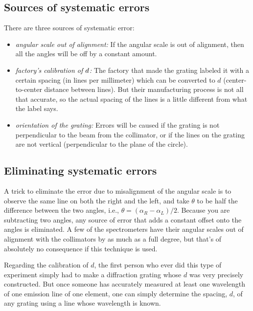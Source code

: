 \subsection*{Sources of systematic errors}

There are three sources of systematic error:

\begin{itemize}
\item[] \emph{angular scale out of alignment:\/} If the angular scale is out
of alignment, then all the angles will be off by a constant amount.

\item[] \emph{factory's calibration of $d\/$:\/} The factory that made the
grating labeled it with a certain spacing (in lines per
millimeter) which can be converted to $d$ (center-to-center
distance between lines). But their manufacturing process is
not all that accurate, so the actual spacing of the lines is
a little different from what the label says.

\item[] \emph{orientation of the grating:\/} Errors will be caused if the grating
is not perpendicular to the beam from the collimator, or if the lines on the
grating are not vertical (perpendicular to the plane of the circle).
\end{itemize}

\subsection*{Eliminating systematic errors}

A trick to eliminate the error due to 
misalignment of the angular scale is to observe the same line on both the
right and the left, and take $\theta$ to be half the difference
between the two angles, i.e., $\theta=(\alpha_R-\alpha_L)/2$.
Because you are subtracting two angles, any source of error
that adds a constant offset onto the angles is eliminated.
A few of the spectrometers have their angular scales out of alignment
with the collimators by as much as a full degree, but that's of
absolutely no consequence if this technique is used.

Regarding the calibration of $d$, 
the first person who ever did this type of experiment simply
had to make a diffraction grating whose $d$ was very precisely
constructed. But once someone
has accurately measured at least one wavelength of one
emission line of one element, one can simply
determine the spacing, $d$, of any grating using a line
whose wavelength is known.


